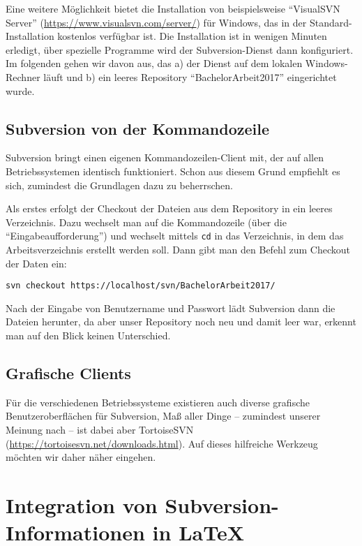 Eine weitere Möglichkeit bietet die Installation von beispielsweise \enquote{VisualSVN Server} (\url{https://www.visualsvn.com/server/}) für Windows, das in der Standard-Installation kostenlos verfügbar ist. Die Installation ist in wenigen Minuten erledigt, über spezielle Programme wird der Subversion-Dienst dann konfiguriert. Im folgenden gehen wir davon aus, das a) der Dienst auf dem lokalen Windows-Rechner läuft und b) ein leeres Repository \enquote{BachelorArbeit2017} eingerichtet wurde.


\subsection{Subversion von der Kommandozeile}

Subversion bringt einen eigenen Kommandozeilen-Client mit, der auf allen Betriebssystemen identisch funktioniert. Schon aus diesem Grund empfiehlt es sich, zumindest die Grundlagen dazu zu beherrschen.

Als erstes erfolgt der Checkout der Dateien aus dem Repository in ein leeres Verzeichnis. Dazu wechselt man auf die Kommandozeile (über die \enquote{Eingabeaufforderung}) und wechselt mittels \texttt{cd} in das Verzeichnis, in dem das Arbeitsverzeichnis erstellt werden soll. Dann gibt man den Befehl zum Checkout der Daten ein:

\texttt{svn checkout https://localhost/svn/BachelorArbeit2017/}

Nach der Eingabe von Benutzername und Passwort lädt Subversion dann die Dateien herunter, da aber unser Repository noch neu und damit leer war, erkennt man auf den Blick keinen Unterschied. 


\subsection{Grafische Clients}

Für die verschiedenen Betriebssysteme existieren auch diverse grafische Benutzeroberflächen für Subversion, Maß aller Dinge -- zumindest unserer Meinung nach -- ist dabei aber TortoiseSVN (\url{https://tortoisesvn.net/downloads.html}). Auf dieses hilfreiche Werkzeug möchten wir daher näher  eingehen.



\section{Integration von Subversion-Informationen in \LaTeX}

